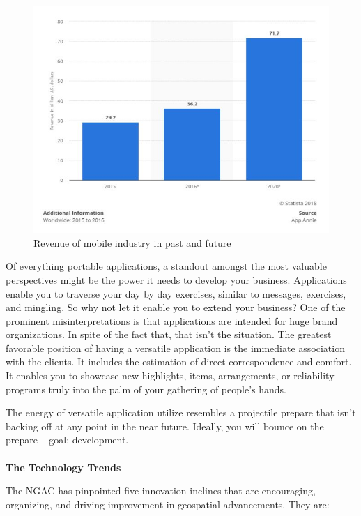 
    \begin{figure}[H]
            \centering
            \includegraphics[width=0.8\linewidth]{figures/ch1/future_work_growth.png}
            \caption{\label{fig:future_work_distribution} Revenue of mobile industry in past and future}
    \end{figure}

Of everything portable applications, a standout amongst the most valuable perspectives might be the power it needs to develop your business. Applications enable you to traverse your day by day exercises, similar to messages, exercises, and mingling. So why not let it enable you to extend your business? One of the prominent misinterpretations is that applications are intended for huge brand organizations. In spite of the fact that, that isn't the situation. The greatest favorable position of having a versatile application is the immediate association with the clients. It includes the estimation of direct correspondence and comfort. It enables you to showcase new highlights, items, arrangements, or reliability programs truly into the palm of your gathering of people's hands. 

The energy of versatile application utilize resembles a projectile prepare that isn't backing off at any point in the near future. Ideally, you will bounce on the prepare – goal: development. \\ \\
\textbf{The Technology Trends}

The NGAC has pinpointed five innovation inclines that are encouraging, organizing, and driving improvement in geospatial advancements. They are: 

